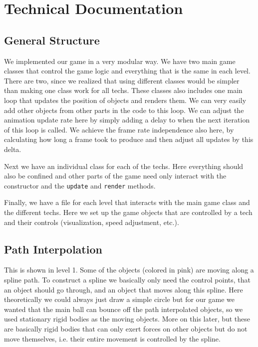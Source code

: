 \documentclass{article}
\begin{document}
\section{Technical Documentation}

\subsection{General Structure}
We implemented our game in a very modular way. We have two main game classes that control the game logic 
and everything that is the same in each level. There are two, since we realized that using different classes would be simpler than making one class work for all techs. These classes also includes one main loop that 
updates the position of objects and renders them. We can very easily add other objects from other parts in the 
code to this loop. We can adjust the animation update rate here 
by simply adding a delay to when the next iteration of this loop is called. 
We achieve the frame rate independence also here, by calculating how long a frame took to produce 
and then adjust all updates by this delta. 

Next we have an individual class for each of the techs. Here everything should 
also be confined and other parts of the game need only interact with the constructor
and the \texttt{update} and \texttt{render} methods.

Finally, we have a file for each level that interacts with the main game 
class and the different techs. Here we set up
the game objects that are controlled by a tech and their controls (visualization, speed adjustment, etc.).

\subsection{Path Interpolation}

This is shown in level 1. Some of the objects (colored in pink) are moving along a spline path. 
To construct a spline we basically only need the control points, that an object should go through, and an 
object that moves along this spline. Here theoretically we could always just draw a simple circle but 
for our game we wanted that the main ball can bounce off the path interpolated objects, so we used stationary rigid bodies
as the moving objects. More on this later, but these are basically rigid bodies that can only 
exert forces on other objects but do not move themselves, i.e. their entire movement is controlled by the spline.
\end{document}

